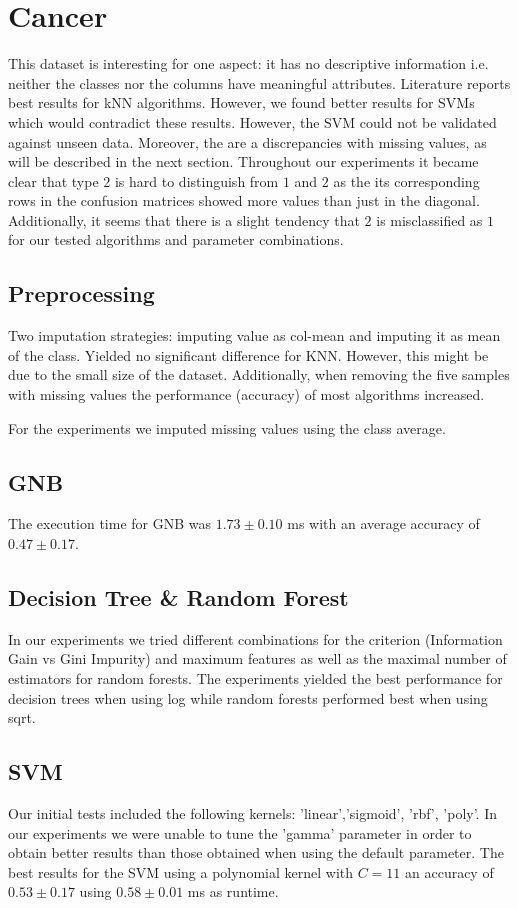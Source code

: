 \section{Cancer}
This dataset is interesting for one aspect: it has no descriptive information i.e. neither the classes nor the columns have meaningful attributes. 
Literature reports best results for kNN algorithms. However, we found better results for SVMs which would contradict these results.
However, the SVM could not be validated against unseen data. 
Moreover, the are a discrepancies with missing values, as will be described in the next section. 
Throughout our experiments it became clear that type $2$ is hard to distinguish from $1$ and $2$ as the its corresponding rows in the confusion matrices showed more values than just in the diagonal. Additionally, it seems that there is a slight tendency that $2$ is misclassified as $1$ for our tested algorithms and parameter combinations. 

\subsection{Preprocessing}
Two imputation strategies: imputing value as col-mean and imputing it as mean of the class. Yielded no significant difference for KNN.
However, this might be due to the small size of the dataset. 
Additionally, when removing the five samples with missing values the performance (accuracy) of most algorithms increased. 

For the experiments we imputed missing values using the class average. 

\subsection{GNB}
The execution time for GNB was $1.73 \pm 0.10$ ms with an average accuracy of $0.47 \pm 0.17$.

\subsection{Decision Tree \& Random Forest}
In our experiments we tried different combinations for the criterion (Information Gain vs Gini Impurity) and maximum features as well as the maximal number of estimators for random forests.
The experiments yielded the best performance for decision trees when using log while random forests performed best when using sqrt. 

\subsection{SVM}
Our initial tests included the following kernels: 'linear','sigmoid', 'rbf', 'poly'. 
In our experiments we were unable to tune the 'gamma' parameter in order to obtain better results than those obtained when using the default parameter.
The best results for the SVM using a polynomial kernel with $C=11$ an accuracy of $0.53 \pm 0.17$ using $0.58 \pm 0.01$ ms as runtime. 

